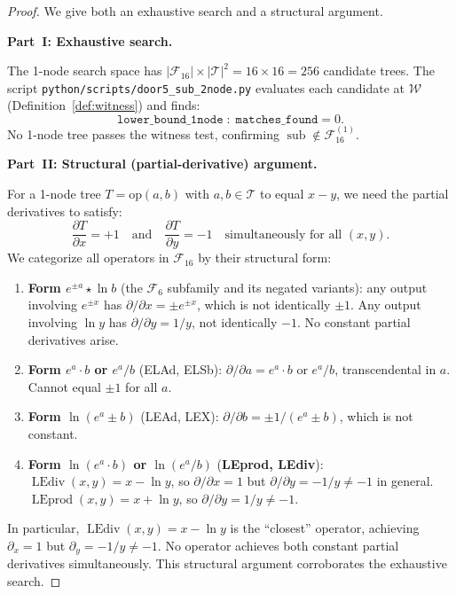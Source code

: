 \documentclass[12pt,a4paper]{article}
\theoremstyle{definition}
\newcommand{\LEdiv}{\operatorname{LEdiv}}
\newcommand{\LEprod}{\operatorname{LEprod}}
\newcommand{\sub}{\operatorname{sub}}
\begin{document}
\begin{proof}
We give both an exhaustive search and a structural argument.

\smallskip
\noindent\textbf{Part~I: Exhaustive search.}

The 1-node search space has $|\mathcal{F}_{16}|\times|\mathcal{T}|^2 = 16\times 16 = 256$ candidate trees.
The script \texttt{python/scripts/door5\_sub\_2node.py} evaluates each
candidate at $\mathcal{W}$ (Definition~\ref{def:witness}) and finds:
\[
  \texttt{lower\_bound\_1node}\;:\;\texttt{matches\_found} = 0.
\]
No 1-node tree passes the witness test, confirming $\sub \notin \mathcal{F}_{16}^{(1)}$.

\smallskip
\noindent\textbf{Part~II: Structural (partial-derivative) argument.}

For a 1-node tree $T = \mathrm{op}(a,b)$ with $a,b\in\mathcal{T}$ to equal $x-y$,
we need the partial derivatives to satisfy:
\[
  \frac{\partial T}{\partial x} = +1 \quad\text{and}\quad
  \frac{\partial T}{\partial y} = -1 \quad \text{simultaneously for all } (x,y).
\]
We categorize all operators in $\mathcal{F}_{16}$ by their structural form:

\begin{enumerate}
  \item \textbf{Form $e^{\pm a}\star\ln b$} (the $\mathcal{F}_6$ subfamily and its
        negated variants): any output involving $e^{\pm x}$ has
        $\partial/\partial x = \pm e^{\pm x}$, which is not identically $\pm 1$.
        Any output involving $\ln y$ has $\partial/\partial y = 1/y$,
        not identically $-1$.  No constant partial derivatives arise.

  \item \textbf{Form $e^{a}\cdot b$ or $e^{a}/b$} (ELAd, ELSb):
        $\partial/\partial a = e^a \cdot b$ or $e^a/b$, transcendental in $a$.
        Cannot equal $\pm 1$ for all $a$.

  \item \textbf{Form $\ln(e^{a}\pm b)$} (LEAd, LEX):
        $\partial/\partial b = \pm 1/(e^{a}\pm b)$, which is not constant.

  \item \textbf{Form $\ln(e^{a}\cdot b)$ or $\ln(e^{a}/b)$} (\textbf{LEprod, LEdiv}):
        $\LEdiv(x,y) = x - \ln y$, so $\partial/\partial x = 1$ but
        $\partial/\partial y = -1/y \neq -1$ in general.
        $\LEprod(x,y) = x + \ln y$, so $\partial/\partial y = 1/y \neq -1$.
\end{enumerate}

In particular, $\LEdiv(x,y) = x - \ln y$ is the ``closest'' operator,
achieving $\partial_x = 1$ but $\partial_y = -1/y \neq -1$.
No operator achieves both constant partial derivatives simultaneously.
This structural argument corroborates the exhaustive search.
\end{proof}
\end{document}
